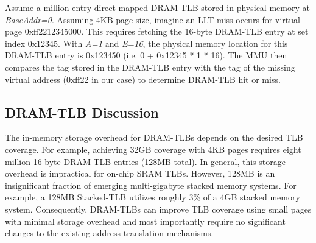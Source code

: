 \noindent Assume a million entry direct-mapped DRAM-TLB stored in
physical memory at {\em BaseAddr=0}. Assuming 4KB page size, imagine
an LLT miss occurs for virtual page 0xff2212345000. This requires
fetching the 16-byte DRAM-TLB entry at set index 0x12345. With {\em
A=1} and {\em E=16}, the physical memory location for this DRAM-TLB
entry is 0x123450 (i.e. 0 + 0x12345 * 1 * 16). The MMU then compares the
tag stored in the DRAM-TLB entry with the tag of the missing virtual
address (0xff22 in our case) to determine DRAM-TLB hit or miss.

\subsection{DRAM-TLB Discussion}

 The in-memory storage overhead for
DRAM-TLBs depends on the desired TLB coverage. For example, achieving
32GB coverage with 4KB pages requires eight million 16-byte DRAM-TLB
entries (128MB total). In general, this storage overhead is
impractical for on-chip SRAM TLBs. However, 128MB is an insignificant
fraction of emerging multi-gigabyte stacked memory systems. For
example, a 128MB Stacked-TLB utilizes roughly 3\% of a 4GB stacked
memory system. Consequently, DRAM-TLBs can improve TLB coverage using
small pages with minimal storage overhead and most importantly require
no significant changes to the existing address translation mechanisms.

% 



